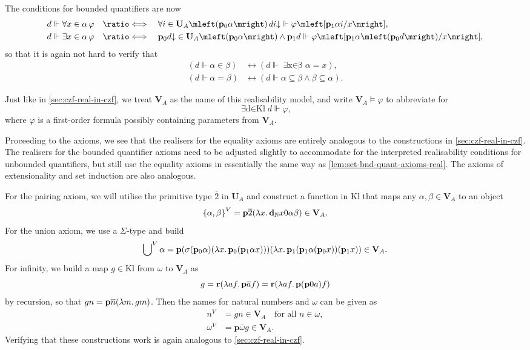 \documentclass[12pt,openany]{book}
\theoremstyle{plain}
\theoremstyle{definition}
\newcommand\opA[1]{\mathop{\forall #1}}
\newcommand\opE[1]{\mathop{\exists #1}}
\newcommand\oplam[1]{\mathop{\lambda #1.}}
\newcommand\defeqv{\quad \ratio\Longleftrightarrow \quad}
\newcommand\Kl{\mathrm{Kl}}
\newcommand\bp{\mathbf{p}}
\newcommand\br{\mathbf{r}}
\newcommand\bdN{\mathbf{d}_\mathbb{N}}
\newcommand\bU{\mathbf{U}}
\newcommand\bV{\mathbf{V}}
\begin{document}
The conditions for bounded quantifiers are now
\begin{align*}
  d \Vdash \opA{x \in \alpha} \varphi & \defeqv \opA{i \in \bU_A\mleft(\bp_0 \alpha\mright)} di {\downarrow} \Vdash \varphi\mleft[\bp_1 \alpha i/x\mright],                                 \\
  d \Vdash \opE{x \in \alpha} \varphi & \defeqv \bp_0 d {\downarrow} \in \bU_A\mleft(\bp_0 \alpha\mright) \land \bp_1 d \Vdash \varphi\mleft[\bp_1 \alpha \mleft(\bp_0 d\mright)/x\mright],
\end{align*}
so that it is again not hard to verify that
\begin{align*}
  \left(d \Vdash \alpha \in \beta\right) & \leftrightarrow \left(d \Vdash \opE{x \in \beta} \alpha = x\right),                        \\
  \left(d \Vdash \alpha = \beta\right)   & \leftrightarrow \left(d \Vdash \alpha \subseteq \beta \land \beta \subseteq \alpha\right).
\end{align*}

Just like in \autoref{sec:czf-real-in-czf}, we treat $\bV_A$ as the name of this realisability model, and write $\bV_A \vDash \varphi$ to abbreviate for
\[\opE{d \in \Kl} d \Vdash \varphi,\]
where $\varphi$ is a first-order formula possibly containing parameters from $\bV_A$.

Proceeding to the axioms, we see that the realisers for the equality axioms are entirely analogous to the constructions in \autoref{sec:czf-real-in-czf}. The realisers for the bounded quantifier axioms need to be adjusted slightly to accommodate for the interpreted realisability conditions for unbounded quantifiers, but still use the equality axioms in essentially the same way as \autoref{lem:set-bnd-quant-axioms-real}. The axioms of extensionality and set induction are also analogous.

For the pairing axiom, we will utilise the primitive type $\overline{2}$ in $\bU_A$ and construct a function in $\Kl$ that maps any $\alpha, \beta \in \bV_A$ to an object
\[\left\{\alpha, \beta\right\}^V = \bp \overline{2} \mleft(\oplam{x} \bdN x0 \alpha \beta\mright) \in \bV_A.\]
For the union axiom, we use a $\Sigma$-type and build
\[\bigcup\nolimits^V \alpha = \bp \mleft(\sigma \mleft(\bp_0 \alpha\mright) \mleft(\oplam{x} \bp_0 \mleft(\bp_1 \alpha x\mright)\mright)\mright) \mleft(\oplam{x} \bp_1 \mleft(\bp_1 \alpha \mleft(\bp_0 x\mright)\mright) \mleft(\bp_1 x\mright)\mright) \in \bV_A.\]
For infinity, we build a map $g \in \Kl$ from $\omega$ to $\bV_A$ as
\[g = \br \mleft(\oplam{af} \bp \overline{a} f\mright) = \br \mleft(\oplam{af} \bp \mleft(\bp 0a\mright) f\mright)\]
by recursion, so that $gn = \bp \overline{n} \mleft(\oplam{m} gm\mright)$. Then the names for natural numbers and $\omega$ can be given as
\begin{align*}
  n^V      & = gn \in \bV_A \quad \text{for all $n \in \omega$}, \\
  \omega^V & = \bp \overline{\omega} g \in \bV_A.
\end{align*}
Verifying that these constructions work is again analogous to \autoref{sec:czf-real-in-czf}.
\end{document}
